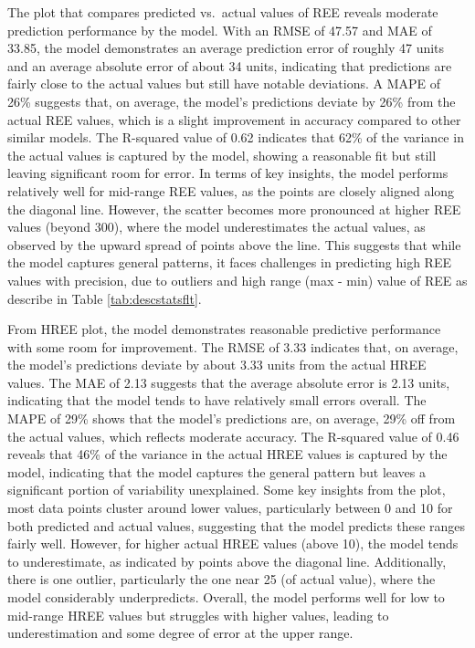 \documentclass[11pt,a4paper,]{article}
\begin{document}
The plot that compares predicted vs.~actual values of REE reveals moderate prediction performance by the model. With an RMSE of 47.57 and MAE of 33.85, the model demonstrates an average prediction error of roughly 47 units and an average absolute error of about 34 units, indicating that predictions are fairly close to the actual values but still have notable deviations. A MAPE of 26\% suggests that, on average, the model's predictions deviate by 26\% from the actual REE values, which is a slight improvement in accuracy compared to other similar models. The R-squared value of 0.62 indicates that 62\% of the variance in the actual values is captured by the model, showing a reasonable fit but still leaving significant room for error. In terms of key insights, the model performs relatively well for mid-range REE values, as the points are closely aligned along the diagonal line. However, the scatter becomes more pronounced at higher REE values (beyond 300), where the model underestimates the actual values, as observed by the upward spread of points above the line. This suggests that while the model captures general patterns, it faces challenges in predicting high REE values with precision, due to outliers and high range (max - min) value of REE as describe in Table \ref{tab:descstatsflt}.

From HREE plot, the model demonstrates reasonable predictive performance with some room for improvement. The RMSE of 3.33 indicates that, on average, the model's predictions deviate by about 3.33 units from the actual HREE values. The MAE of 2.13 suggests that the average absolute error is 2.13 units, indicating that the model tends to have relatively small errors overall. The MAPE of 29\% shows that the model's predictions are, on average, 29\% off from the actual values, which reflects moderate accuracy. The R-squared value of 0.46 reveals that 46\% of the variance in the actual HREE values is captured by the model, indicating that the model captures the general pattern but leaves a significant portion of variability unexplained. Some key insights from the plot, most data points cluster around lower values, particularly between 0 and 10 for both predicted and actual values, suggesting that the model predicts these ranges fairly well. However, for higher actual HREE values (above 10), the model tends to underestimate, as indicated by points above the diagonal line. Additionally, there is one outlier, particularly the one near 25 (of actual value), where the model considerably underpredicts. Overall, the model performs well for low to mid-range HREE values but struggles with higher values, leading to underestimation and some degree of error at the upper range.
\end{document}

